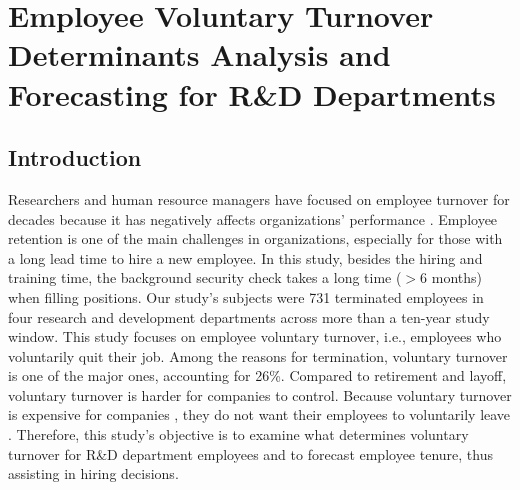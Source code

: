 \chapter{Employee Voluntary Turnover Determinants Analysis and Forecasting for R\&D Departments} \label{ch:4}
\section{Introduction}
Researchers and human resource managers have focused on employee turnover for decades because it has negatively affects organizations' performance \citep{shaw2011}. Employee retention is one of the main challenges in organizations, especially for those with a long lead time to hire a new employee. In this study, besides the hiring and training time, the background security check takes a long time ($>6$ months) when filling positions. Our study's subjects were 731 terminated employees in four research and development departments across more than a ten-year study window. This study focuses on employee voluntary turnover, i.e., employees who voluntarily quit their job. Among the reasons for termination, voluntary turnover is one of the major ones, accounting for 26\%. Compared to retirement and layoff, voluntary turnover is harder for companies to control. Because voluntary turnover is expensive for companies \citep{selden2000}, they do not want their employees to voluntarily leave \citep{allen2010}. Therefore, this study's objective is to examine what determines voluntary turnover for R\&D department employees and to forecast employee tenure, thus assisting in hiring decisions. 

